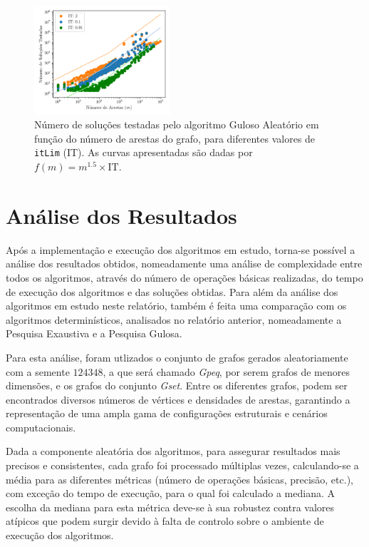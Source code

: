\documentclass[mirror, portugues]{revdetua}
\begin{document}
\begin{figure}[H]
    \centering
    \includegraphics[width=0.45\textwidth]{../assets/sols_Random Greedy.png}
    \caption{Número de soluções testadas pelo algoritmo Guloso Aleatório em função do número de arestas do grafo, para diferentes valores de \texttt{itLim} (IT). As curvas apresentadas são dadas por $f(m) = m^{1.5} \times \text{IT}$.}
    \label{fig:sols_randomgreedy}
\end{figure}

\section{Análise dos Resultados}

Após a implementação e execução dos algoritmos em estudo, torna-se possível a análise dos resultados obtidos, nomeadamente uma análise de complexidade entre todos os algoritmos, através do número de operações básicas realizadas, do tempo de execução dos algoritmos e das soluções obtidas. Para além da análise dos algoritmos em estudo neste relatório, também é feita uma comparação com os algoritmos determinísticos, analisados no relatório anterior, nomeadamente a Pesquisa Exaustiva e a Pesquisa Gulosa.

Para esta análise, foram utlizados o conjunto de grafos gerados aleatoriamente com a semente $124348$, a que será chamado \textit{Gpeq}, por serem grafos de menores dimensões, e os grafos do conjunto \textit{Gset}. Entre os diferentes grafos, podem ser encontrados diversos números de vértices e densidades de arestas, garantindo a representação de uma ampla gama de configurações estruturais e cenários computacionais.

Dada a componente aleatória dos algoritmos, para assegurar resultados mais precisos e consistentes, cada grafo foi processado múltiplas vezes, calculando-se a média para as diferentes métricas (número de operações básicas, precisão, etc.), com exceção do tempo de execução, para o qual foi calculado a mediana. A escolha da mediana para esta métrica deve-se à sua robustez contra valores atípicos que podem surgir devido à falta de controlo sobre o ambiente de execução dos algoritmos.
\end{document}
